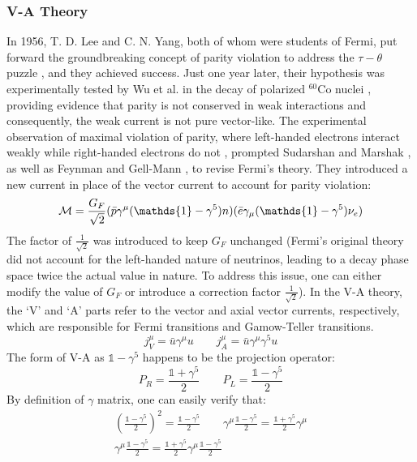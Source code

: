 \subsubsection{V-A Theory}
In 1956, T. D. Lee and C. N. Yang, both of whom were students of Fermi, put forward
the groundbreaking concept of parity violation to address the $\tau-\theta$ puzzle \cite{PhysRev.105.1671}, 
and they achieved success. Just one year later, their hypothesis was experimentally tested
by Wu et al. in the decay of polarized ${}^{60}$Co nuclei \cite{PhysRev.105.1413}, 
providing evidence that parity is not conserved in weak interactions and 
consequently, the weak current is not pure vector-like. 
The experimental observation of maximal violation of parity, where left-handed 
electrons interact weakly while right-handed electrons do not \cite{PhysRev.109.1015}, 
prompted Sudarshan and Marshak \cite{PhysRev.109.1860.2}, as well as 
Feynman and Gell-Mann \cite{PhysRev.109.193}, to revise Fermi's theory. 
They introduced a new current in place of the vector current to account for
parity violation:
\begin{equation}
    \CM = \frac{G_F}{\sqrt{2}}(\bar{p} \gamma^\mu(\mathds{1} - \gamma^5) n) (\bar{e} \gamma_\mu(\mathds{1} - \gamma^5) \nu_e)
\end{equation}
The factor of $\frac{1}{\sqrt{2}}$ was introduced to keep $G_F$ unchanged (Fermi's
original theory did not account for the left-handed nature of neutrinos, leading
to a decay phase space twice the actual value in nature. To address this issue, 
one can either modify the value of $G_F$ or introduce a correction factor $\frac{1}{\sqrt{2}}$).
In the V-A theory, the `V' and `A' parts refer to the vector and axial vector currents, 
respectively, which are responsible for Fermi transitions and Gamow-Teller transitions.
\begin{equation}
    j_V^\mu = \bar{u}\gamma^\mu u   \qquad 
    j_A^\mu = \bar{u}\gamma^\mu\gamma^5 u   
\end{equation}
The form of V-A as $\mathds{1} - \gamma^5$ happens to be the projection operator:
\begin{equation}
    P_R = \frac{\mathds{1} + \gamma^5}{2}   \qquad P_L = \frac{\mathds{1} - \gamma^5}{2}
\end{equation}
By definition of $\gamma$ matrix, one can easily verify that:
\begin{equation}
    \begin{gathered}
	\left(\frac{\mathds{1} - \gamma^5}{2} \right)^2 = \frac{\mathds{1} - \gamma^5}{2} 
	\qquad 
	\gamma^\mu \frac{\mathds{1} - \gamma^5}{2} = \frac{\mathds{1} + \gamma^5}{2} \gamma^\mu \\
	\gamma^\mu \frac{\mathds{1} - \gamma^5}{2} = \frac{\mathds{1} + \gamma^5}{2} \gamma^\mu \frac{\mathds{1}-\gamma^5}{2}
    \end{gathered}
\end{equation}
